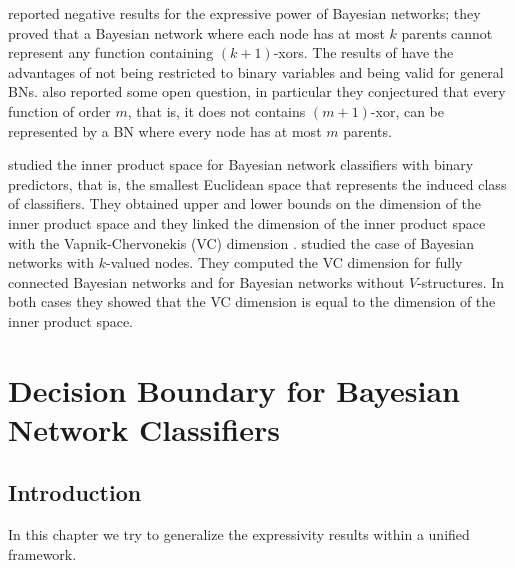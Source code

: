 \documentclass[11pt,a4paper, twoside]{book}
\newtheorem{theorem}{Theorem}[chapter]
\begin{document}
\citet{Ling03} reported negative results for the expressive power of Bayesian networks; they proved that a Bayesian network where each node has at most $k$ parents cannot represent any function containing $(k+1)$-xors.
%
The results of \cite{Ling03} have the advantages of not being restricted to binary variables and being valid for general BNs. 
\cite{Ling03} also reported some open question, in particular they conjectured that every function of order $m$, that is, it does not contains $(m+1)$-xor, can be represented by a BN where every node has at most $m$ parents.


\citet{Nakamura05} studied the inner product space for Bayesian network classifiers with binary predictors, that is, the smallest Euclidean space that represents the induced class of classifiers. They obtained upper and lower bounds on the dimension of the inner product space and they linked the dimension of the inner product space with the Vapnik-Chervonekis (VC) dimension \citep{vapnik}.
\citet{Yang2012} studied the case of Bayesian networks with $k$-valued nodes. They computed the VC dimension  for fully connected Bayesian networks and for Bayesian networks without $V$-structures. In both cases they showed that the VC dimension is equal to the dimension of the inner product space.



\chapter{Decision Boundary for Bayesian Network Classifiers}
\label{chp:decbound}

\section{Introduction}

     
In this chapter we try to generalize the expressivity results \citep{Minsky61stepstoward, peot, Jaeger03} within a unified framework. 
\end{document}
